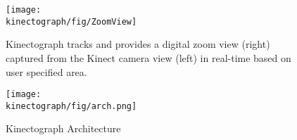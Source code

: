 \begin{figure}[t]
\centering
\texttt{[image: \\kinectograph/fig/ZoomView]}
\caption{Kinectograph tracks and provides a digital zoom view (right) captured from the Kinect camera view (left) in real-time based on user specified area.}
\label{fig:ZoomView}
\end{figure}

\begin{figure}[t]
\centering
\texttt{[image: \\kinectograph/fig/arch.png]}
\caption{Kinectograph Architecture}
\label{fig:architecture}
\end{figure}
